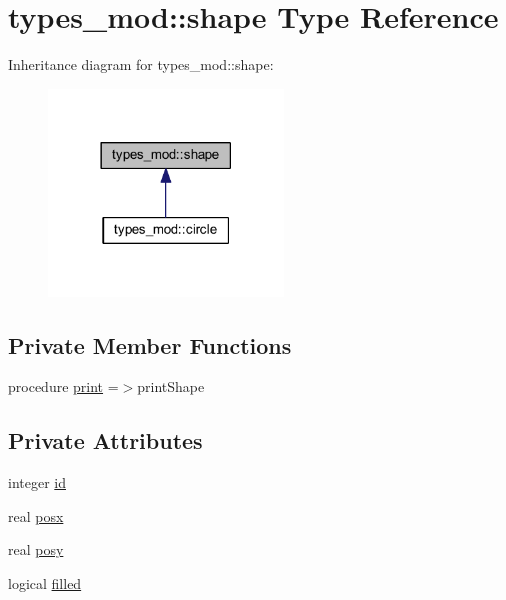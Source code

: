 \hypertarget{structtypes__mod_1_1shape}{}\section{types\+\_\+mod\+:\+:shape Type Reference}
\label{structtypes__mod_1_1shape}


Inheritance diagram for types\+\_\+mod\+:\+:shape\+:
\nopagebreak
\begin{figure}[H]
\begin{center}
\leavevmode
\includegraphics[width=177pt]{structtypes__mod_1_1shape__inherit__graph}
\end{center}
\end{figure}
\subsection*{Private Member Functions}
\begin{DoxyCompactItemize}
\item 
procedure \hyperlink{structtypes__mod_1_1shape_a5dcc9f8c35d773c39cf2dd037384372f}{print} =$>$print\+Shape
\end{DoxyCompactItemize}
\subsection*{Private Attributes}
\begin{DoxyCompactItemize}
\item 
integer \hyperlink{structtypes__mod_1_1shape_a7b42c10b99ecc401b25653f24943c874}{id}
\item 
real \hyperlink{structtypes__mod_1_1shape_a85cc6141bd06372d74cca0ab698a90cb}{posx}
\item 
real \hyperlink{structtypes__mod_1_1shape_a0eadb644d5bf6cc0bdc1b966f7e7080e}{posy}
\item 
logical \hyperlink{structtypes__mod_1_1shape_a555f9af7c5614d1009ccdf4400f98585}{filled}
\end{DoxyCompactItemize}


